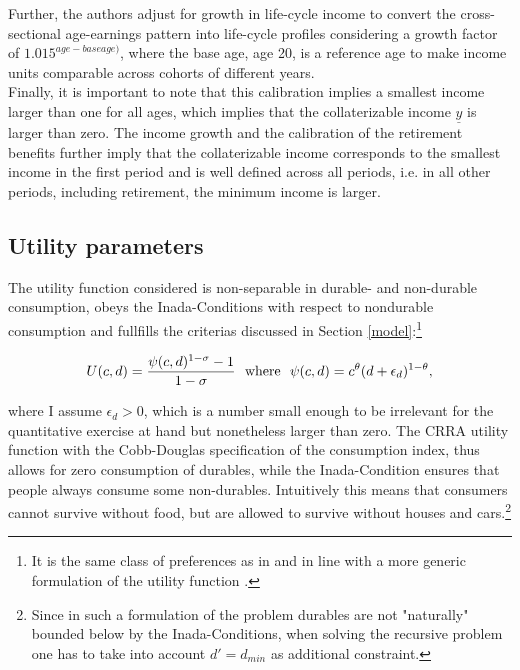 \documentclass[a4paper,12pt,legno]{article}
\begin{document}
Further, the authors adjust for growth in life-cycle income to convert the cross-sectional age-earnings pattern into life-cycle profiles considering a growth factor of $1.015^{age-base age)}$, where the base age, age 20, is a reference age to make income units comparable across cohorts of different years.\\
Finally, it is important to note that this calibration implies a smallest income larger than one for all ages, which implies that the collaterizable income $\underline{y}$ is larger than zero. The income growth and the calibration of the retirement benefits further imply that the collaterizable income corresponds to the smallest income in the first period and is well defined across all periods, i.e. in all other periods, including retirement, the minimum income is larger. 

\subsection{Utility parameters}

The utility function considered is non-separable in durable- and non-durable consumption, obeys the Inada-Conditions with respect to nondurable consumption and fullfills the criterias discussed in Section \ref{model}:\footnote{It is the same class of preferences as in \cite{hintermaier2010} and in line with a more generic formulation of the utility function \citep{FV&K2011}.}

\begin{equation}
U(c,d)=\frac{\psi(c,d)^{1-\sigma}-1}{1-\sigma} \ \ \textnormal{where} \ \ \psi(c,d)=c^{\theta}(d+\epsilon_{d})^{1-\theta},
\end{equation}

where I assume $\epsilon_{d} > 0$, which is a number small enough to be irrelevant for the quantitative exercise at hand but nonetheless larger than zero. The CRRA utility function with the Cobb-Douglas specification of the consumption index, thus allows for zero consumption of durables, while the Inada-Condition ensures that people always consume some non-durables. Intuitively this means that consumers cannot survive without food, but are allowed to survive without houses and cars.\footnote{Since in such a formulation of the problem durables are not "naturally" bounded below by the Inada-Conditions, when solving the recursive problem one has to take into account $d' = d_{min}$ as additional constraint.}
\end{document}
